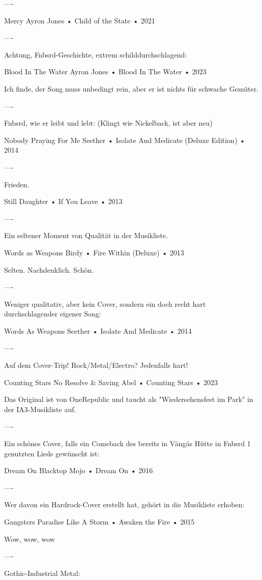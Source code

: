----

Mercy
Ayron Jones
 •
Child of the State
 • 2021

----

Achtung, Fnbsrd-Geschichte, extrem schilddurchschlagend:

Blood In The Water
Ayron Jones
 •
Blood In The Water
 • 2023

Ich finde, der Song muss unbedingt rein, aber er ist nichts für schwache Gemüter.

----

Fnbsrd, wie er leibt und lebt:
(Klingt wie Nickelback, ist aber neu)

Nobody Praying For Me
Seether
 •
Isolate And Medicate (Deluxe Edition)
 • 2014

----

Frieden.

Still
Daughter
 •
If You Leave
 • 2013

----

Ein seltener Moment von Qualität in der Musikliste.

Words as Weapons
Birdy
 •
Fire Within (Deluxe)
 • 2013

Selten. Nachdenklich. Schön.

----

Weniger qualitativ, aber kein Cover, sondern ein doch recht hart durchschlagender eigener Song:

Words As Weapons
Seether
 •
Isolate And Medicate
 • 2014

----

Auf dem Cover-Trip! Rock/Metal/Electro? Jedenfalls hart!

Counting Stars
No Resolve
 &
Saving Abel
 •
Counting Stars
 • 2023

Das Original ist von OneRepublic und taucht als "Wiedersehensfest im Park" in der IA3-Musikliste auf.

----

Ein schönes Cover, falls ein Comeback des bereits in Vängäs Hütte in Fnbsrd 1 genutzten Lieds gewünscht ist:

Dream On
Blacktop Mojo
 •
Dream On
 • 2016

----

Wer davon ein Hardrock-Cover erstellt hat, gehört in die Musikliste erhoben:

Gangsters Paradise
Like A Storm
 •
Awaken the Fire
 • 2015

Wow, wow, wow

----

Gothic-Industrial Metal:

